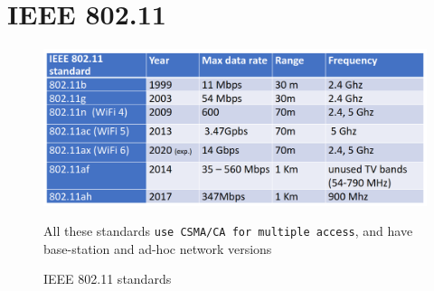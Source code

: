 \chapter{IEEE 802.11}

\begin{figure}[htbp]
   \centering
   \includegraphics{images/ieee_bgn.png}
   \caption{IEEE 802.11 standards}
   \label{fig:ieee_bgn}
   All these standards \texttt{use \texttt{CSMA/CA} for multiple access}, and have base-station and ad-hoc network versions
\end{figure}